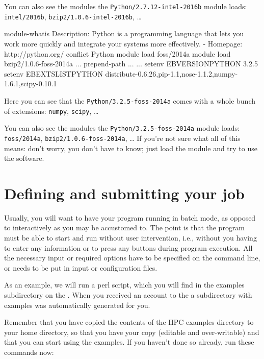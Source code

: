 You can also see the modules the \lstinline|Python/2.7.12-intel-2016b| module loads:
\lstinline|intel/2016b|, \lstinline|bzip2/1.0.6-intel-2016b|, \ldots

\else
\begin{prompt}
module-whatis	 Description: Python is a programming language that lets you work more quickly and integrate your systems more effectively. - Homepage: http://python.org/
conflict	 Python
module		 load foss/2014a
module		 load bzip2/1.0.6-foss-2014a
...
prepend-path ...
...
setenv		 EBVERSIONPYTHON 3.2.5
setenv		 EBEXTSLISTPYTHON distribute-0.6.26,pip-1.1,nose-1.1.2,numpy-1.6.1,scipy-0.10.1

\end{prompt}

Here you can see that the \lstinline|Python/3.2.5-foss-2014a| comes with a whole
bunch of extensions: \lstinline|numpy|, \lstinline|scipy|, \ldots

You can also see the modules the \lstinline|Python/3.2.5-foss-2014a| module loads:
\lstinline|foss/2014a|, \lstinline|bzip2/1.0.6-foss-2014a|, \ldots
\fi
If you're not sure what all of this means: don't worry, you don't have to know;
just load the module and try to use the software.


\section{Defining and submitting your job}
\hypertarget{sec:defining-and-submitting-job}{}

Usually, you will want to have your program running in batch mode, as opposed
to interactively as you may be accustomed to. The point is that the program
must be able to start and run without user intervention, i.e., without you
having to enter any information or to press any buttons during program
execution. All the necessary input or required options have to be specified on
the command line, or needs to be put in input or configuration files.

As an example, we will run a perl script, which you will find in the examples
subdirectory on the \hpc. When you received an account to the \hpc a
subdirectory with examples was automatically generated for you.

Remember that you have copied the contents of the HPC examples directory to
your home directory, so that you have your  copy (editable
and over-writable) and that you can start using the examples. If you haven't
done so already, run these commands now:

